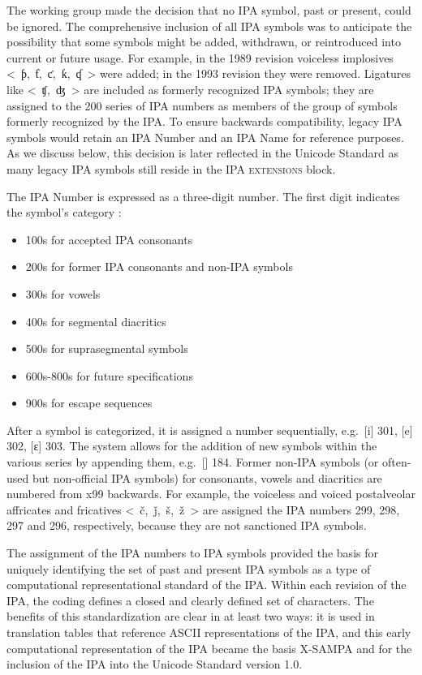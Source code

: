 The working group made the decision that no IPA symbol, past or present, 
could be ignored. The comprehensive inclusion of all IPA symbols was to 
anticipate the possibility that some symbols might be added, withdrawn, 
or reintroduced into current or future usage. For example, in the 1989 
revision voiceless implosives <~ƥ,~ƭ,~ƈ,~ƙ,~ʠ~> were added; in the 1993 
revision they were removed. Ligatures like <~ʧ,~ʤ~> are included as formerly 
recognized IPA symbols; they are assigned to the 200 series of IPA numbers 
as members of the group of symbols formerly recognized by the IPA. To ensure 
backwards compatibility, legacy IPA symbols would retain an IPA Number and 
an IPA Name for reference purposes. As we discuss below, this decision is 
later reflected in the Unicode Standard as many legacy IPA symbols still reside in 
the \textsc{IPA extensions} block.

The IPA Number is expressed as a three-digit number. The first digit 
indicates the symbol's category \citep{Esling1990,EslingGaylord1993}:

\begin{itemize}
	\item 100s for accepted IPA consonants
	\item 200s for former IPA consonants and non-IPA symbols
	\item 300s for vowels
	\item 400s for segmental diacritics
	\item 500s for suprasegmental symbols
	\item 600s-800s for future specifications
	\item 900s for escape sequences
\end{itemize}

After a symbol is categorized, it is assigned a number sequentially, e.g.\ [i]
301, [e] 302, [ɛ] 303. The system allows for the addition of new symbols within
the various series by appending them, e.g.\ [] 184. Former non-IPA
symbols (or often-used but non-official IPA symbols) for consonants, vowels and
diacritics are numbered from x99 backwards. For example, the voiceless and
voiced postalveolar affricates and fricatives <~č,~ǰ,~š,~ž~> are assigned the
IPA numbers 299, 298, 297 and 296, respectively, because they are not sanctioned
IPA symbols.

The assignment of the IPA numbers to IPA symbols provided the basis for uniquely
identifying the set of past and present IPA symbols as a type of computational
representational standard of the IPA. Within each revision of the IPA, the
coding defines a closed and clearly defined set of characters. The benefits of
this standardization are clear in at least two ways: it is used in translation
tables that reference ASCII representations of the IPA, and this early
computational representation of the IPA became the basis X-SAMPA and for the
inclusion of the IPA into the Unicode Standard version 1.0.

